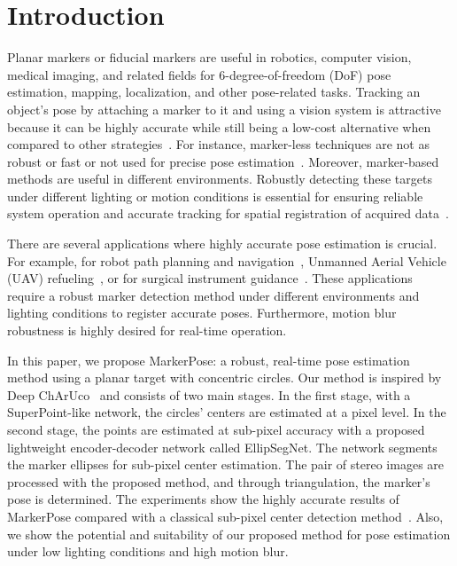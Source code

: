\documentclass[final]{cvpr}
\begin{document}
\section{Introduction}
Planar markers or fiducial markers are useful in robotics, computer vision, medical imaging, and related fields for 6-degree-of-freedom (DoF) pose estimation, mapping, localization, and other pose-related tasks. Tracking an object's pose by attaching a marker to it and using a vision system is attractive because it can be highly accurate while still being a low-cost alternative when compared to other strategies~\cite{brown2018design}. For instance, marker-less techniques are not as robust or fast or not used for precise pose estimation~\cite{nath2019using}. Moreover, marker-based methods are useful in different environments. Robustly detecting these targets under different lighting or motion conditions is essential for ensuring reliable system operation and accurate tracking for spatial registration of acquired data~\cite{kam2018improvement, kim2020marker}.

There are several applications where highly accurate pose estimation is crucial. For example, for robot path planning and navigation~\cite{lee2018path}, Unmanned Aerial Vehicle (UAV) refueling~\cite{sun2019bionic}, or for surgical instrument guidance~\cite{basafa2017visual}. These applications require a robust marker detection method under different environments and lighting conditions to register accurate poses. Furthermore, motion blur robustness is highly desired for real-time operation.

In this paper, we propose MarkerPose: a robust, real-time pose estimation method using a planar target with concentric circles. Our method is inspired by Deep ChArUco~\cite{hu2019deep} and consists of two main stages. In the first stage, with a SuperPoint-like network, the circles' centers are estimated at a pixel level. In the second stage, the points are estimated at sub-pixel accuracy with a proposed lightweight encoder-decoder network called EllipSegNet. The network segments the marker ellipses for sub-pixel center estimation. The pair of stereo images are processed with the proposed method, and through triangulation, the marker's pose is determined. The experiments show the highly accurate results of MarkerPose compared with a classical sub-pixel center detection method~\cite{Romero:2020gp}. Also, we show the potential and suitability of our proposed method for pose estimation under low lighting conditions and high motion blur.
\end{document}
